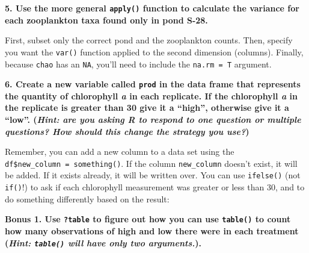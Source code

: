 \documentclass[]{book}
\newenvironment{Shaded}{\begin{snugshade}}{\end{snugshade}}
\newcommand{\DataTypeTok}[1]{\textcolor[rgb]{0.13,0.29,0.53}{#1}}
\newcommand{\DecValTok}[1]{\textcolor[rgb]{0.00,0.00,0.81}{#1}}
\newcommand{\KeywordTok}[1]{\textcolor[rgb]{0.13,0.29,0.53}{\textbf{#1}}}
\newcommand{\NormalTok}[1]{#1}
\newcommand{\OperatorTok}[1]{\textcolor[rgb]{0.81,0.36,0.00}{\textbf{#1}}}
\newcommand{\StringTok}[1]{\textcolor[rgb]{0.31,0.60,0.02}{#1}}
\begin{document}
\textbf{5. Use the more general \texttt{apply()} function to calculate the variance for each zooplankton taxa found only in pond S-28.}

First, subset only the correct pond and the zooplankton counts. Then, specify you want the \texttt{var()} function applied to the second dimension (columns). Finally, because \texttt{chao} has an \texttt{NA}, you'll need to include the \texttt{na.rm\ =\ T} argument.

\begin{Shaded}
\end{Shaded}

\textbf{6. Create a new variable called \texttt{prod} in the data frame that represents the quantity of chlorophyll \emph{a} in each replicate. If the chlorophyll \emph{a} in the replicate is greater than 30 give it a ``high'', otherwise give it a ``low''. (\emph{Hint: are you asking R to respond to one question or multiple questions? How should this change the strategy you use?})}

Remember, you can add a new column to a data set using the \texttt{df\$new\_column\ =\ something()}. If the column \texttt{new\_column} doesn't exist, it will be added. If it exists already, it will be written over. You can use \texttt{ifelse()} (not \texttt{if()}!) to ask if each chlorophyll measurement was greater or less than 30, and to do something differently based on the result:

\begin{Shaded}
\end{Shaded}

\textbf{Bonus 1. Use \texttt{?table} to figure out how you can use \texttt{table()} to count how many observations of high and low there were in each treatment (\emph{Hint: \texttt{table()} will have only two arguments.}).}
\end{document}
